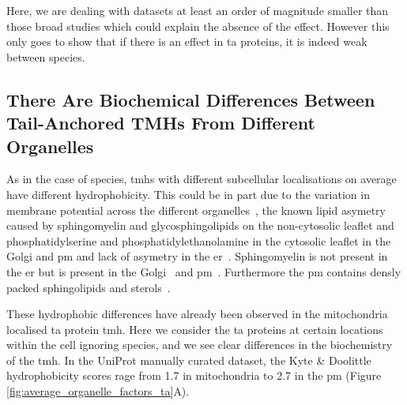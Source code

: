 Here, we are dealing with datasets at least an order of magnitude smaller than those broad studies \cite{Sharpe2010, Baker2017} which could explain the absence of the effect.
However this only goes to show that if there is an effect in \gls{ta} proteins, it is indeed weak between species.


\subsection{There Are Biochemical Differences Between Tail-Anchored TMHs From Different Organelles}

As in the case of species, \gls{tmh}s with different subcellular localisations on average  have different hydrophobicity.
This could be in part due to the variation in membrane potential across the different organelles~\cite{Qin2011, Worley1994, Schapiro2000}, the known lipid asymetry caused by sphingomyelin and glycosphingolipids on the non-cytosolic leaflet and phosphatidylserine and phosphatidylethanolamine in the cytosolic leaflet in the Golgi and \gls{pm} and lack of asymetry in the \gls{er}~\cite{Daleke2007, Devaux2004}.
Sphingomyelin is not present in the \gls{er} but is present in the Golgi~\cite{Futerman2005} and \gls{pm}~\cite{Li2007, Tafesse2007}.
Furthermore the \gls{pm} contains densly packed sphingolipids and sterols~\cite{Paolo2006}.

These hydrophobic differences have already been observed in the mitochondria localised \gls{ta} protein \gls{tmh}.
Here we consider the \gls{ta} proteins at certain locations within the cell ignoring species, and we see clear differences in the biochemistry of the \gls{tmh}.
In the UniProt manually curated dataset, the Kyte \& Doolittle hydrophobicity scores rage from 1.7 in mitochondria to 2.7 in the \gls{pm} (Figure \ref{fig:average_organelle_factors_ta}A).

